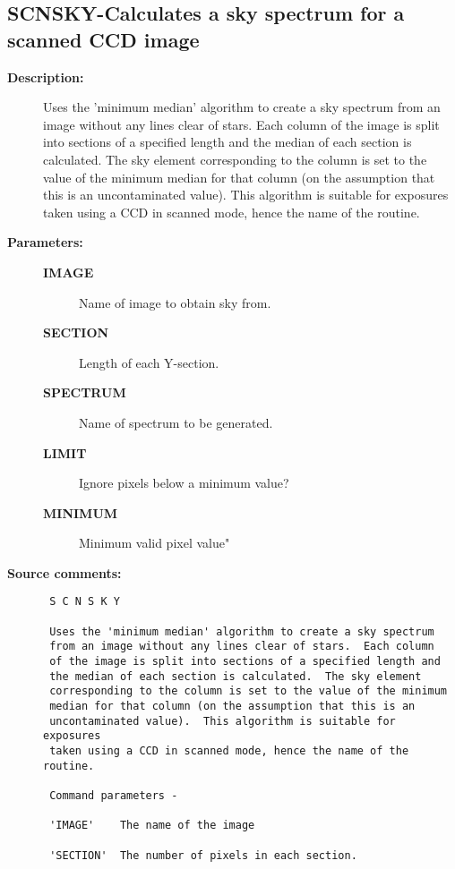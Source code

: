 \subsection{SCNSKY-\label{SCNSKY}Calculates a sky spectrum for a scanned CCD image}
\begin{description}

\item [{\bf Description:}]
 Uses the 'minimum median' algorithm to create a sky spectrum
 from an image without any lines clear of stars.  Each column
 of the image is split into sections of a specified length and
 the median of each section is calculated.  The sky element
 corresponding to the column is set to the value of the minimum
 median for that column (on the assumption that this is an
 uncontaminated value).  This algorithm is suitable for exposures
 taken using a CCD in scanned mode, hence the name of the routine.

\item [{\bf Parameters:}]
\begin{description}
\item [{\bf IMAGE}]
 Name of image to obtain sky from.
\item [{\bf SECTION}]
 Length of each Y-section.
\item [{\bf SPECTRUM}]
 Name of spectrum to be generated.
\item [{\bf LIMIT}]
 Ignore pixels below a minimum value?
\item [{\bf MINIMUM}]
 Minimum valid pixel value"
\end{description}

\item [{\bf Source comments:}]
\begin{verbatim}
 S C N S K Y

 Uses the 'minimum median' algorithm to create a sky spectrum
 from an image without any lines clear of stars.  Each column
 of the image is split into sections of a specified length and
 the median of each section is calculated.  The sky element
 corresponding to the column is set to the value of the minimum
 median for that column (on the assumption that this is an
 uncontaminated value).  This algorithm is suitable for exposures
 taken using a CCD in scanned mode, hence the name of the routine.

 Command parameters -

 'IMAGE'    The name of the image

 'SECTION'  The number of pixels in each section.


\end{verbatim}
\end{description}
